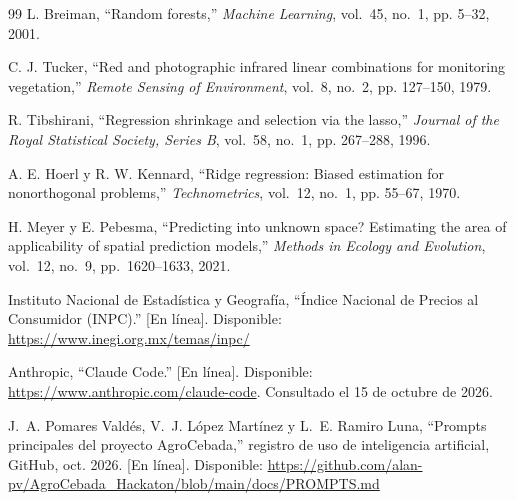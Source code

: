 \begin{thebibliography}{99}
L. Breiman, ``Random forests,'' \emph{Machine Learning}, vol.~45, no.~1, pp. 5--32, 2001.

C. J. Tucker, ``Red and photographic infrared linear combinations for monitoring vegetation,'' \emph{Remote Sensing of
Environment}, vol.~8, no.~2, pp. 127--150, 1979.

R. Tibshirani, ``Regression shrinkage and selection via the lasso,'' \emph{Journal of the Royal Statistical Society,
Series B}, vol.~58, no.~1, pp. 267--288, 1996.

A. E. Hoerl y R. W. Kennard, ``Ridge regression: Biased estimation for nonorthogonal problems,'' \emph{Technometrics},
vol.~12, no.~1, pp. 55--67, 1970.

H. Meyer y E. Pebesma, ``Predicting into unknown space? Estimating the area of applicability of spatial prediction
models,'' \emph{Methods in Ecology and Evolution}, vol.~12, no.~9, pp.~1620--1633, 2021.

Instituto Nacional de Estadística y Geografía, ``Índice Nacional de Precios al Consumidor (INPC).'' [En línea].
Disponible: \url{https://www.inegi.org.mx/temas/inpc/}


Anthropic, ``Claude Code.'' [En línea]. Disponible: \url{https://www.anthropic.com/claude-code}. Consultado el 15 de
octubre de 2026.

J.~A. Pomares Valdés, V.~J. López Martínez y L.~E. Ramiro Luna, ``Prompts principales del proyecto AgroCebada,''
registro de uso de inteligencia artificial, GitHub, oct. 2026. [En línea]. Disponible:
\url{https://github.com/alan-pv/AgroCebada_Hackaton/blob/main/docs/PROMPTS.md}

\end{thebibliography}

